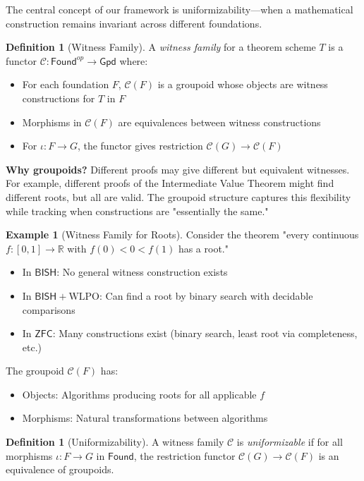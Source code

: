 \documentclass[11pt]{article}
\theoremstyle{plain}
\theoremstyle{definition}
\newtheorem{definition}[theorem]{Definition}
\newtheorem{example}[theorem]{Example}
\newcommand{\R}{\mathbb{R}}
\newcommand{\WLPO}{\mathrm{WLPO}}
\newcommand{\BISH}{\mathsf{BISH}}
\newcommand{\ZFC}{\mathsf{ZFC}}
\newcommand{\Found}{\mathsf{Found}}
\newcommand{\Gpd}{\mathsf{Gpd}}
\begin{document}
The central concept of our framework is uniformizability—when a mathematical construction remains invariant across different foundations.

\begin{definition}[Witness Family]\label{def:witness-family}
A \emph{witness family} for a theorem scheme $T$ is a functor $\mathcal{C}: \Found^{op} \to \Gpd$ where:
\begin{itemize}
\item For each foundation $F$, $\mathcal{C}(F)$ is a groupoid whose objects are witness constructions for $T$ in $F$
\item Morphisms in $\mathcal{C}(F)$ are equivalences between witness constructions
\item For $\iota: F \to G$, the functor gives restriction $\mathcal{C}(G) \to \mathcal{C}(F)$
\end{itemize}
\end{definition}

\begin{intuitionbox}
\textbf{Why groupoids?} Different proofs may give different but equivalent witnesses. For example, different proofs of the Intermediate Value Theorem might find different roots, but all are valid. The groupoid structure captures this flexibility while tracking when constructions are "essentially the same."
\end{intuitionbox}

\begin{example}[Witness Family for Roots]
Consider the theorem "every continuous $f: [0,1] \to \R$ with $f(0) < 0 < f(1)$ has a root."
\begin{itemize}
\item In $\BISH$: No general witness construction exists
\item In $\BISH + \WLPO$: Can find a root by binary search with decidable comparisons
\item In $\ZFC$: Many constructions exist (binary search, least root via completeness, etc.)
\end{itemize}
The groupoid $\mathcal{C}(F)$ has:
\begin{itemize}
\item Objects: Algorithms producing roots for all applicable $f$
\item Morphisms: Natural transformations between algorithms
\end{itemize}
\end{example}

\begin{definition}[Uniformizability]\label{def:uniformizable}
A witness family $\mathcal{C}$ is \emph{uniformizable} if for all morphisms $\iota: F \to G$ in $\Found$, the restriction functor $\mathcal{C}(G) \to \mathcal{C}(F)$ is an equivalence of groupoids.
\end{definition}
\end{document}
